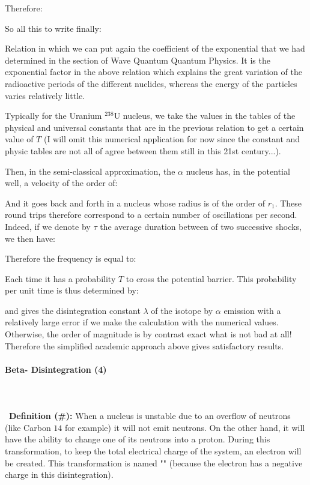 	Therefore:
	
	So all this to write finally:
	
	Relation in which we can put again the coefficient of the exponential that we had determined in the section of Wave Quantum Quantum Physics. It is the exponential factor in the above relation which explains the great variation of the radioactive periods of the different nuclides, whereas the energy of the particles varies relatively little.
	
	Typically for the Uranium $^{238}\mathrm{U}$ nucleus, we take the values in the tables of the physical and universal constants that are in the previous relation to get a certain value of $T$ (I will omit this numerical application for now since the constant and physic tables are not all of agree between them still in this 21st century...).
	
	Then, in the semi-classical approximation, the $\alpha$ nucleus has, in the potential well, a velocity of the order of:
	
	And it goes back and forth in a nucleus whose radius is of the order of $r_1$. These round trips therefore correspond to a certain number of oscillations per second. Indeed, if we denote by $\tau$ the average duration between of two successive shocks, we then have:
	
	Therefore the frequency is equal to:
	
	Each time it has a probability $T$ to cross the potential barrier. This probability per unit time is thus determined by:
	
	and gives the disintegration constant $\lambda$ of the isotope by $\alpha$ emission with a relatively large error if we make the calculation with the numerical values. Otherwise, the order of magnitude is by contrast exact what is not bad at all! Therefore the simplified academic approach above gives satisfactory results.
	
	\pagebreak
	\paragraph{Beta- Disintegration (4)}\mbox{}\\\\\
	\textbf{Definition (\#\mydef):} When a nucleus is unstable due to an overflow of neutrons (like Carbon $14$ for example) it will not emit neutrons. On the other hand, it will have the ability to change one of its neutrons into a proton. During this transformation, to keep the total electrical charge of the system, an electron will be created. This transformation is named "" (because the electron has a negative charge in this disintegration).
	
